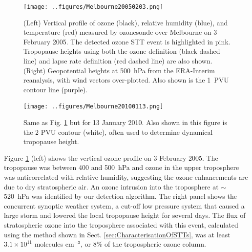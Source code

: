     \begin{figure}[t]
      \texttt{[image: ..figures/Melbourne20050203.png]}
      \caption{(Left) Vertical profile of ozone (black), relative humidity (blue), and temperature (red) measured by ozonesonde over Melbourne on 3 February 2005.
      The detected ozone STT event is highlighted in pink.
      Tropopause heights using both the ozone definition (black dashed line) and lapse rate definition (red dashed line) are also shown.
      (Right) Geopotential heights at 500~hPa from the ERA-Interim reanalysis, with wind vectors over-plotted.
      Also shown is the 1~PVU contour line (purple).}
      \label{fig:Melbourne20050203}
    \end{figure}
    
    \begin{figure}[t]
      \texttt{[image: ..figures/Melbourne20100113.png]}
      \caption{Same as Fig. \ref{fig:Melbourne20050203} but for 13 January 2010.
	Also shown in this figure is the 2 PVU contour (white), often used to determine dynamical tropopause height.}
      \label{fig:Melbourne20100113}
    \end{figure}
    
    Figure \ref{fig:Melbourne20050203} (left) shows the vertical ozone profile on 3 February 2005.
    The tropopause was between 400 and 500~hPa and ozone in the upper troposphere was anticorrelated with relative humidity, suggesting the ozone enhancements are due to dry stratospheric air. 
    An ozone intrusion into the troposphere at $\sim$520~hPa was identified by our detection algorithm.
    The right panel shows the concurrent synoptic weather system, a cut-off low pressure system that caused a large storm and lowered the local tropopause height for several days.
    The flux of stratospheric ozone into the troposphere associated with this event, calculated using the method shown in Sect. \ref{sec:CharacterisationOfSTTs}, was at least $3.1 \times 10^{11}$ molecules cm$^{-3}$, or 8\% of the tropospheric ozone column.
    
